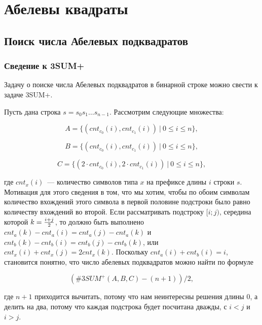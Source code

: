 \section{Абелевы квадраты}

\subsection{Поиск числа Абелевых подквадратов}

\subsubsection{Сведение к 3SUM+}
Задачу о поиске числа Абелевых подквадратов в бинарной строке можно свести к задаче 3SUM+.

Пусть дана строка $s=s_0s_1 \ldots s_{n-1}$. Рассмотрим следующие множества:

\begin{equation}
A = \{ (cnt_{c_0}(i), cnt_{c_1}(i))\ |\ 0 \le i \le n \},
\end{equation}

\begin{equation}
B = \{ (cnt_{c_0}(i), cnt_{c_1}(i))\ |\ 0 \le i \le n \},
\end{equation}

\begin{equation}
C = \{ (2 \cdot cnt_{c_0}(i), 2 \cdot cnt_{c_1}(i))\ |\ 0 \le i \le n \},
\end{equation}


где $cnt_x(i)$~--- количество символов типа $x$ на префиксе длины $i$ строки $s$. Мотивация для этого сведения в том, что мы хотим, чтобы по обоим символам количество вхождений этого символа в первой половине подстроки было равно количеству вхождений во второй. Если рассматривать подстроку $[i; j)$, середина которой $k={{i+j} \over 2}$, то должно быть выполнено $cnt_a(k)-cnt_a(i)=cnt_a(j)-cnt_a(k)$ и $cnt_b(k)-cnt_b(i)=cnt_b(j)-cnt_b(k)$, или $cnt_x(i)+cnt_x(j)=2cnt_x(k)$. Поскольку $cnt_a(i)+cnt_b(i)=i$, становится понятно, что число абелевых подквадратов можно найти по формуле 

\begin{equation}
(\#3SUM^+(A, B, C) - (n+1)) / 2,
\end{equation}

где $n+1$ приходится вычитать, потому что нам неинтересны решения длины 0, а делить на два, потому что каждая подстрока будет посчитана дважды, с $i<j$ и $i>j$.

